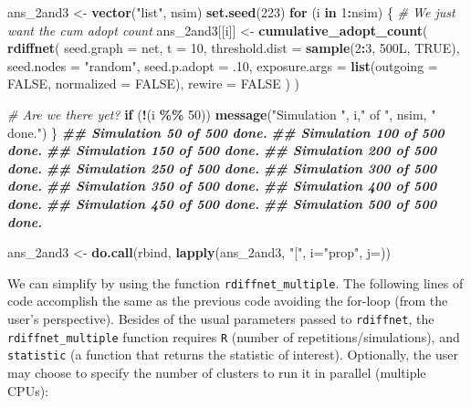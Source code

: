 \documentclass[
]{book}
\newenvironment{Shaded}{\begin{snugshade}}{\end{snugshade}}
\newcommand{\AttributeTok}[1]{\textcolor[rgb]{0.13,0.29,0.53}{#1}}
\newcommand{\CommentTok}[1]{\textcolor[rgb]{0.56,0.35,0.01}{\textit{#1}}}
\newcommand{\ConstantTok}[1]{\textcolor[rgb]{0.56,0.35,0.01}{#1}}
\newcommand{\ControlFlowTok}[1]{\textcolor[rgb]{0.13,0.29,0.53}{\textbf{#1}}}
\newcommand{\DecValTok}[1]{\textcolor[rgb]{0.00,0.00,0.81}{#1}}
\newcommand{\DocumentationTok}[1]{\textcolor[rgb]{0.56,0.35,0.01}{\textbf{\textit{#1}}}}
\newcommand{\FunctionTok}[1]{\textcolor[rgb]{0.13,0.29,0.53}{\textbf{#1}}}
\newcommand{\NormalTok}[1]{#1}
\newcommand{\OtherTok}[1]{\textcolor[rgb]{0.56,0.35,0.01}{#1}}
\newcommand{\SpecialCharTok}[1]{\textcolor[rgb]{0.81,0.36,0.00}{\textbf{#1}}}
\newcommand{\StringTok}[1]{\textcolor[rgb]{0.31,0.60,0.02}{#1}}
\begin{document}
\begin{Shaded}
\begin{Highlighting}[]
\NormalTok{ans\_2and3 }\OtherTok{\textless{}{-}} \FunctionTok{vector}\NormalTok{(}\StringTok{"list"}\NormalTok{, nsim)}
\FunctionTok{set.seed}\NormalTok{(}\DecValTok{223}\NormalTok{)}
\ControlFlowTok{for}\NormalTok{ (i }\ControlFlowTok{in} \DecValTok{1}\SpecialCharTok{:}\NormalTok{nsim) \{}
  \CommentTok{\# We just want the cum adopt count}
\NormalTok{  ans\_2and3[[i]] }\OtherTok{\textless{}{-}} 
    \FunctionTok{cumulative\_adopt\_count}\NormalTok{(}
      \FunctionTok{rdiffnet}\NormalTok{(}
        \AttributeTok{seed.graph =}\NormalTok{ net,}
        \AttributeTok{t =} \DecValTok{10}\NormalTok{,}
        \AttributeTok{threshold.dist =} \FunctionTok{sample}\NormalTok{(}\DecValTok{2}\SpecialCharTok{:}\DecValTok{3}\NormalTok{, 500L, }\ConstantTok{TRUE}\NormalTok{),}
        \AttributeTok{seed.nodes =} \StringTok{"random"}\NormalTok{,}
        \AttributeTok{seed.p.adopt =}\NormalTok{ .}\DecValTok{10}\NormalTok{,}
        \AttributeTok{exposure.args =} \FunctionTok{list}\NormalTok{(}\AttributeTok{outgoing =} \ConstantTok{FALSE}\NormalTok{, }\AttributeTok{normalized =} \ConstantTok{FALSE}\NormalTok{),}
        \AttributeTok{rewire =} \ConstantTok{FALSE}
\NormalTok{        )}
\NormalTok{      )}
  
  \CommentTok{\# Are we there yet?}
  \ControlFlowTok{if}\NormalTok{ (}\SpecialCharTok{!}\NormalTok{(i }\SpecialCharTok{\%\%} \DecValTok{50}\NormalTok{))}
    \FunctionTok{message}\NormalTok{(}\StringTok{"Simulation "}\NormalTok{, i,}\StringTok{" of "}\NormalTok{, nsim, }\StringTok{" done."}\NormalTok{)}
\NormalTok{\}}
\DocumentationTok{\#\# Simulation 50 of 500 done.}
\DocumentationTok{\#\# Simulation 100 of 500 done.}
\DocumentationTok{\#\# Simulation 150 of 500 done.}
\DocumentationTok{\#\# Simulation 200 of 500 done.}
\DocumentationTok{\#\# Simulation 250 of 500 done.}
\DocumentationTok{\#\# Simulation 300 of 500 done.}
\DocumentationTok{\#\# Simulation 350 of 500 done.}
\DocumentationTok{\#\# Simulation 400 of 500 done.}
\DocumentationTok{\#\# Simulation 450 of 500 done.}
\DocumentationTok{\#\# Simulation 500 of 500 done.}

\NormalTok{ans\_2and3 }\OtherTok{\textless{}{-}} \FunctionTok{do.call}\NormalTok{(rbind, }\FunctionTok{lapply}\NormalTok{(ans\_2and3, }\StringTok{"["}\NormalTok{, }\AttributeTok{i=}\StringTok{"prop"}\NormalTok{, }\AttributeTok{j=}\NormalTok{))}
\end{Highlighting}
\end{Shaded}

We can simplify by using the function \texttt{rdiffnet\_multiple}. The following lines of code accomplish the same as the previous code avoiding the for-loop (from the user's perspective). Besides of the usual parameters passed to \texttt{rdiffnet}, the \texttt{rdiffnet\_multiple} function requires \texttt{R} (number of repetitions/simulations), and \texttt{statistic} (a function that returns the statistic of interest). Optionally, the user may choose to specify the number of clusters to run it in parallel (multiple CPUs):
\end{document}
